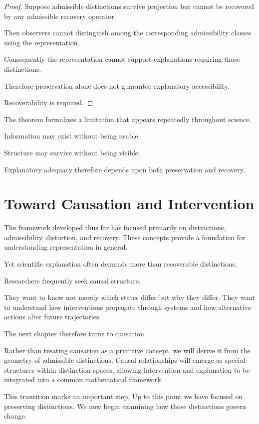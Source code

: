 \documentclass[11pt,oneside,openany]{book}
\begin{document}
\begin{proof}

Suppose admissible distinctions survive projection but cannot be recovered by any admissible recovery operator.

Then observers cannot distinguish among the corresponding admissibility classes using the representation.

Consequently the representation cannot support explanations requiring those distinctions.

Therefore preservation alone does not guarantee explanatory accessibility.

Recoverability is required.

\end{proof}

The theorem formalizes a limitation that appears repeatedly throughout science.

Information may exist without being usable.

Structure may survive without being visible.

Explanatory adequacy therefore depends upon both preservation and recovery.

\section{Toward Causation and Intervention}

The framework developed thus far has focused primarily on distinctions, admissibility, distortion, and recovery. These concepts provide a foundation for understanding representation in general.

Yet scientific explanation often demands more than recoverable distinctions.

Researchers frequently seek causal structure.

They want to know not merely which states differ but why they differ. They want to understand how interventions propagate through systems and how alternative actions alter future trajectories.

The next chapter therefore turns to causation.

Rather than treating causation as a primitive concept, we will derive it from the geometry of admissible distinctions. Causal relationships will emerge as special structures within distinction spaces, allowing intervention and explanation to be integrated into a common mathematical framework.

This transition marks an important step. Up to this point we have focused on preserving distinctions. We now begin examining how those distinctions govern change.
\end{document}
